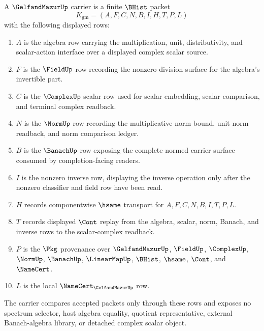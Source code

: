 \begin{definition}
\label{def:gelfand-mazur-carrier}
A $\GelfandMazurUp$ carrier is a finite $\BHist$ packet
$$
K_{\mathrm{gm}}=(A,F,C,N,B,I,H,T,P,L)
$$
with the following displayed rows:
\begin{enumerate}
\item $A$ is the algebra row carrying the multiplication, unit, distributivity, and scalar-action interface over a displayed complex scalar source.
\item $F$ is the $\FieldUp$ row recording the nonzero division surface for the algebra's invertible part.
\item $C$ is the $\ComplexUp$ scalar row used for scalar embedding, scalar comparison, and terminal complex readback.
\item $N$ is the $\NormUp$ row recording the multiplicative norm bound, unit norm readback, and norm comparison ledger.
\item $B$ is the $\BanachUp$ row exposing the complete normed carrier surface consumed by completion-facing readers.
\item $I$ is the nonzero inverse row, displaying the inverse operation only after the nonzero classifier and field row have been read.
\item $H$ records componentwise $\hsame$ transport for $A,F,C,N,B,I,T,P,L$.
\item $T$ records displayed $\Cont$ replay from the algebra, scalar, norm, Banach, and inverse rows to the scalar-complex readback.
\item $P$ is the $\Pkg$ provenance over $\GelfandMazurUp$, $\FieldUp$, $\ComplexUp$, $\NormUp$, $\BanachUp$, $\LinearMapUp$, $\BHist$, $\hsame$, $\Cont$, and $\NameCert$.
\item $L$ is the local $\NameCert_{\GelfandMazurUp}$ row.
\end{enumerate}
The carrier compares accepted packets only through these rows and exposes no spectrum selector, host algebra equality, quotient representative, external Banach-algebra library, or detached complex scalar object.
\end{definition}

